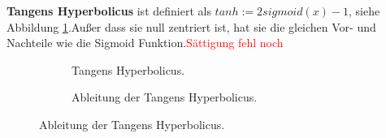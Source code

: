 \documentclass[12pt,a4paper]{scrartcl}
\numberwithin{equation}{section}
\begin{document}
 \textbf{Tangens Hyperbolicus} ist definiert als	$ tanh := 2sigmoid(x) -1$, siehe Abbildung \ref{fig:tanh}.Außer dass sie null zentriert ist, hat sie die gleichen Vor- und Nachteile wie die Sigmoid Funktion.\textcolor{red}{Sättigung fehl noch}
	\begin{figure}[h]
		\caption{Tangens Hyperbolicus.}
		\begin{subfigure}{.5\textwidth}	
			\centering	
			\caption{Tangens Hyperbolicus.}
		\end{subfigure}%
		\begin{subfigure}{.5\textwidth}		
			\centering
			\caption{Ableitung der Tangens Hyperbolicus.}
		\end{subfigure}
			\label{fig:tanh}		
	\end{figure}
	
\end{document}
